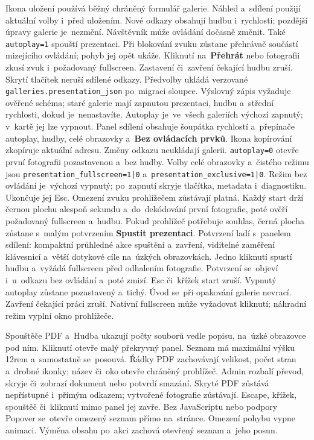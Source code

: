 \documentclass[11pt,a4paper]{article}
\newcommand{\ui}[1]{\textbf{#1}}
\newcommand{\codeword}[1]{\nolinkurl{#1}}
\begin{document}
Ikona uložení používá běžný chráněný formulář galerie. Náhled a~sdílení
použijí aktuální volby i~před uložením. Nové odkazy obsahují hudbu i~rychlosti;
pozdější úpravy galerie je~nezmění. Návštěvník může ovládání dočasně změnit.
Také \codeword{autoplay=1} spouští prezentaci. Při blokování zvuku zůstane
přehrávač součástí mizejícího ovládání; pohyb jej opět ukáže.
Kliknutí na~\ui{Přehrát} nebo fotografii zkusí zvuk i~požadovaný fullscreen.
Zastavení či~zavření čekající hudbu zruší. Skrytí tlačítek neruší sdílené
odkazy.
Předvolby ukládá verzované \codeword{galleries.presentation_json} po~migraci
sloupce. Výslovný zápis vyžaduje ověřené schéma; staré galerie mají zapnutou
prezentaci, hudbu a~střední rychlosti, dokud je~nenastavíte.
Autoplay je~ve~všech galeriích výchozí zapnutý; v~kartě jej lze vypnout.
Panel sdílení obsahuje šoupátka rychlostí a~přepínače autoplay, hudby,
celé obrazovky a~\ui{Bez ovládacích prvků}. Ikona kopírování zkopíruje aktuální
adresu. Změny odkazu neukládají galerii. \codeword{autoplay=0} otevře první
fotografii pozastavenou a~bez hudby. Volby celé obrazovky a~čistého režimu jsou
\codeword{presentation_fullscreen=1|0} a~\codeword{presentation_exclusive=1|0}.
Režim bez ovládání je~výchozí vypnutý; po~zapnutí skryje tlačítka, metadata
i~diagnostiku. Ukončuje jej Esc. Omezení zvuku prohlížečem zůstávají platná.
Každý start drží černou plochu alespoň sekundu a~do~dekódování první fotografie,
poté ověří požadovaný fullscreen a~hudbu. Pokud prohlížeč potřebuje souhlas,
černá plocha zůstane s~malým potvrzením \ui{Spustit prezentaci}.
Potvrzení ladí s~panelem sdílení: kompaktní průhledné akce spuštění a~zavření,
viditelné zaměření klávesnicí a~větší dotykové cíle na~úzkých obrazovkách.
Jedno kliknutí spustí hudbu a~vyžádá fullscreen před odhalením fotografie.
Potvrzení se~objeví i~u~odkazu bez ovládání a~poté zmizí.
Esc či~křížek start zruší. Vypnutý autoplay zůstane pozastavený a~tichý.
Úvod se~při opakování galerie nevrací. Zavření čekající práci zruší.
Nativní fullscreen může vyžadovat kliknutí; náhradní režim vyplní okno
prohlížeče.

Spouštěče PDF a~Hudba ukazují počty souborů vedle popisu, na~úzké
obrazovce pod ním. Kliknutí otevře malý překryvný panel. Seznam má
maximální výšku 12rem a~samostatně se~posouvá. Řádky PDF zachovávají
velikost, počet stran a~drobné ikonky; název či~oko otevře chráněný
prohlížeč. Admin rozbalí převod, skryje či~zobrazí dokument nebo potvrdí
smazání. Skryté PDF zůstává nepřístupné i~přímým odkazem; vytvořené
fotografie zůstávají. Escape, křížek, spouštěč či~kliknutí mimo panel
jej zavře. Bez JavaScriptu nebo podpory Popover se~otevře omezený seznam
přímo na~stránce. Omezení pohybu vypne animaci. Výměna obsahu po~akci
zachová otevřený seznam a~jeho posun.
\end{document}

